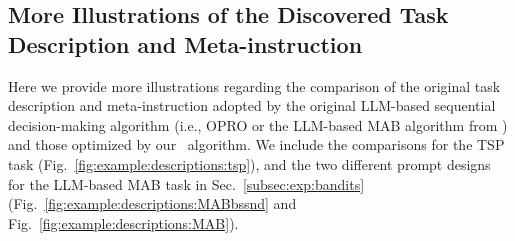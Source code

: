 \subsection{More Illustrations of the Discovered Task Description and Meta-instruction}
\label{app:subsec:more:illustration:meta-prompt}
Here we provide more illustrations regarding the comparison of the original task description and meta-instruction adopted by the original LLM-based sequential decision-making algorithm (i.e., OPRO or the LLM-based MAB algorithm from \citet{krishnamurthy2024can}) and those optimized by our \alg~algorithm.
We include the comparisons for the TSP task (Fig.~\ref{fig:example:descriptions:tsp}), and the two different prompt designs for the LLM-based MAB task in Sec.~\ref{subsec:exp:bandits} (Fig.~\ref{fig:example:descriptions:MABbssnd} and Fig.~\ref{fig:example:descriptions:MAB}).


